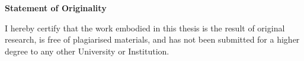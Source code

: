 \begin{titlepage}

\begin{center}
\Large{\bf{Statement of Originality}}
\end{center}

\vspace{0.2in}

\begin{spacing}{2}

I hereby certify that the work embodied in this thesis is the result of original research, is free of plagiarised materials, and has not been submitted for a higher degree to any other University or Institution.

\end{spacing}

\vspace{6cm}

\begin{center}
	\makebox[4cm]{\dotfill}  \hfill \makebox[4cm]{\dotfill}\\
	      \hfill {}
\end{center}
\end{titlepage}
\newpage